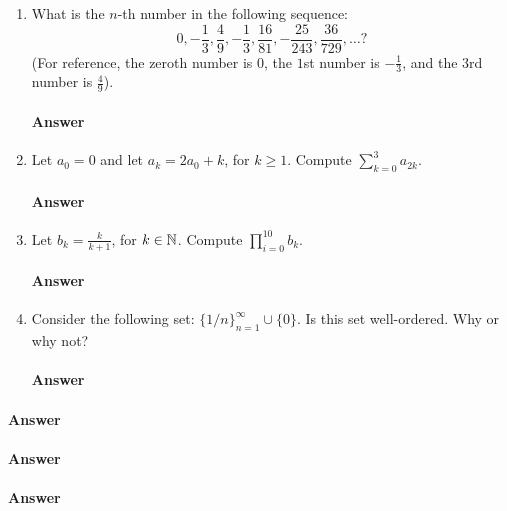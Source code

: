 \begin{enumerate}

    \item What is the $n$-th number in the following sequence:
        $$
            0, -\frac{1}{3}, \frac{4}{9}, -\frac{1}{3}, \frac{16}{81},
            -\frac{25}{243}, \frac{36}{729}, \ldots?
        $$
        (For reference,
        the zeroth number is $0$, the $1$st number is $-\frac{1}{3}$, and the $3$rd
        number is $\frac{4}{9}$).
        \paragraph{Answer}
        \todo{}

    \item Let $a_0=0$ and let $a_k=2a_0+k$, for $k\geq 1$.
        Compute $\sum_{k=0}^3 a_{2k}$.
        \paragraph{Answer}
        \todo{}

    \item Let $b_k=\frac{k}{k+1}$, for $k\in {\mathbb N}$.
        Compute  $\prod_{i=0}^{10} b_{k}$.
        \paragraph{Answer}
        \todo{}

    \item Consider the following set: $\{ 1/n\}_{n=1}^{\infty} \cup \{ 0 \}$.
        Is this set well-ordered. Why or why not?
        \paragraph{Answer}
        \todo{}



\end{enumerate}

\collab{\todo{}}


\paragraph{Answer}
\todo{}

\collab{\todo{}}


\paragraph{Answer}
\todo{}

\collab{\todo{}}


\paragraph{Answer}
\todo{}
